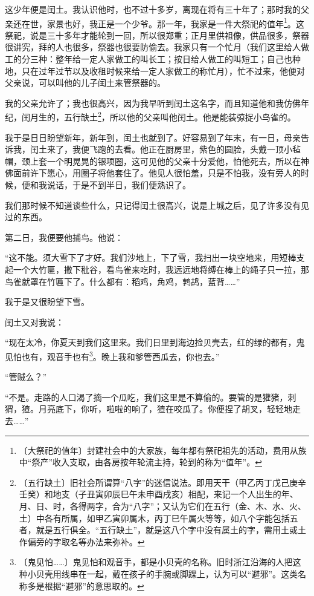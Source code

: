 \documentclass[12pt,UTF-8,openany]{ctexbook}
\begin{document}
\begin{normalsize}
    这少年便是闰土。我认识他时，也不过十多岁，离现在将有三十年了；那时我的父亲还在世，家景也好，我正是一个少爷。那一年，我家是一件大祭祀的值年\footnote{〔大祭祀的值年〕封建社会中的大家族，每年都有祭祀祖先的活动，费用从族中“祭产”收入支取，由各房按年轮流主持，轮到的称为“值年”。}。这祭祀，说是三十多年才能轮到一回，所以很郑重；正月里供祖像，供品很多，祭器很讲究，拜的人也很多，祭器也很要防偷去。我家只有一个忙月（我们这里给人做工的分三种：整年给一定人家做工的叫长工；按日给人做工的叫短工；自己也种地，只在过年过节以及收租时候来给一定人家做工的称忙月），忙不过来，他便对父亲说，可以叫他的儿子闰土来管祭器的。
    
    我的父亲允许了；我也很高兴，因为我早听到闰土这名字，而且知道他和我仿佛年纪，闰月生的，五行缺土\footnote{〔五行缺土〕旧社会所谓算“八字”的迷信说法。即用天干（甲乙丙丁戊己庚辛壬癸）和地支（子丑寅卯辰巳午未申酉戌亥）相配，来记一个人出生的年、月、日、时，各得两字，合为“八字”；又认为它们在五行（金、木、水、火、土）中各有所属，如甲乙寅卯属木，丙丁巳午属火等等，如八个字能包括五者，就是五行俱全。“五行缺土”，就是这八个字中没有属土的字，需用土或土作偏旁的字取名等办法来弥补。}，所以他的父亲叫他闰土。他是能装弶捉小鸟雀的。
    
    我于是日日盼望新年，新年到，闰土也就到了。好容易到了年末，有一日，母亲告诉我，闰土来了，我便飞跑的去看。他正在厨房里，紫色的圆脸，头戴一顶小毡帽，颈上套一个明晃晃的银项圈，这可见他的父亲十分爱他，怕他死去，所以在神佛面前许下愿心，用圈子将他套住了。他见人很怕羞，只是不怕我，没有旁人的时候，便和我说话，于是不到半日，我们便熟识了。
    
    我们那时候不知道谈些什么，只记得闰土很高兴，说是上城之后，见了许多没有见过的东西。
    
    第二日，我便要他捕鸟。他说：
    
    “这不能。须大雪下了才好。我们沙地上，下了雪，我扫出一块空地来，用短棒支起一个大竹匾，撒下秕谷，看鸟雀来吃时，我远远地将缚在棒上的绳子只一拉，那鸟雀就罩在竹匾下了。什么都有：稻鸡，角鸡，鹁鸪，蓝背……”
    
    我于是又很盼望下雪。
    
    闰土又对我说：
    
    “现在太冷，你夏天到我们这里来。我们日里到海边捡贝壳去，红的绿的都有，鬼见怕也有，观音手也有\footnote{〔鬼见怕……〕鬼见怕和观音手，都是小贝壳的名称。旧时浙江沿海的人把这种小贝壳用线串在一起，戴在孩子的手腕或脚踝上，认为可以“避邪”。这类名称多是根据“避邪”的意思取的。}。晚上我和爹管西瓜去，你也去。”
    
    “管贼么？”
    
    “不是。走路的人口渴了摘一个瓜吃，我们这里是不算偷的。要管的是獾猪，刺猬，猹。月亮底下，你听，啦啦的响了，猹在咬瓜了。你便捏了胡叉，轻轻地走去……”
    

\end{normalsize}
\end{document}

